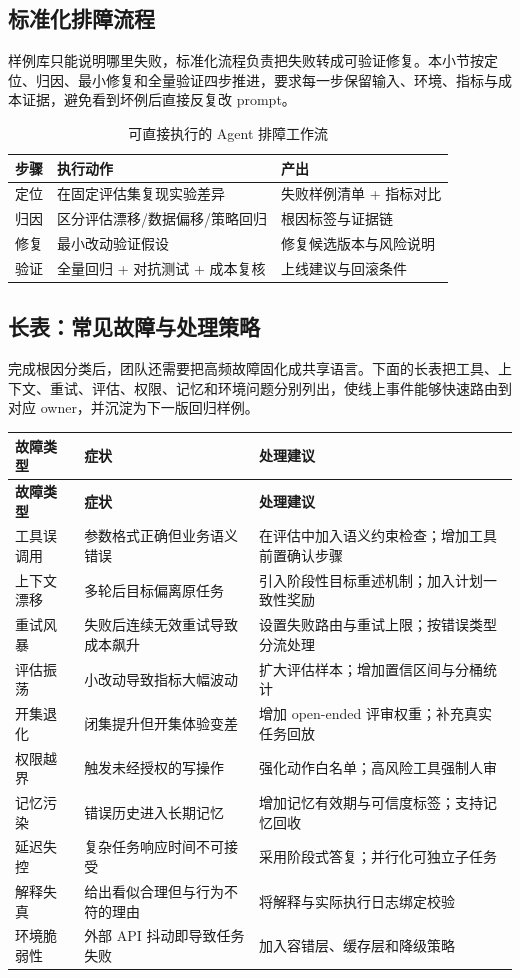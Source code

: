 \subsection{标准化排障流程}
样例库只能说明哪里失败，标准化流程负责把失败转成可验证修复。本小节按定位、归因、最小修复和全量验证四步推进，要求每一步保留输入、环境、指标与成本证据，避免看到坏例后直接反复改 prompt。
\begin{table}[H]
\centering
\begin{tabular}{p{2.5cm}p{4.2cm}p{4.9cm}}
\toprule
\textbf{步骤} & \textbf{执行动作} & \textbf{产出} \\
\midrule
定位 & 在固定评估集复现实验差异 & 失败样例清单 + 指标对比 \\
归因 & 区分评估漂移/数据偏移/策略回归 & 根因标签与证据链 \\
修复 & 最小改动验证假设 & 修复候选版本与风险说明 \\
验证 & 全量回归 + 对抗测试 + 成本复核 & 上线建议与回滚条件 \\
\bottomrule
\end{tabular}
\caption{可直接执行的 Agent 排障工作流}
\end{table}

\subsection{长表：常见故障与处理策略}
完成根因分类后，团队还需要把高频故障固化成共享语言。下面的长表把工具、上下文、重试、评估、权限、记忆和环境问题分别列出，使线上事件能够快速路由到对应 owner，并沉淀为下一版回归样例。
\begin{longtable}{p{2.7cm}p{4.0cm}p{4.9cm}}
\toprule
\textbf{故障类型} & \textbf{症状} & \textbf{处理建议} \\
\midrule
\endfirsthead
\toprule
\textbf{故障类型} & \textbf{症状} & \textbf{处理建议} \\
\midrule
\endhead
工具误调用 & 参数格式正确但业务语义错误 & 在评估中加入语义约束检查；增加工具前置确认步骤 \\
上下文漂移 & 多轮后目标偏离原任务 & 引入阶段性目标重述机制；加入计划一致性奖励 \\
重试风暴 & 失败后连续无效重试导致成本飙升 & 设置失败路由与重试上限；按错误类型分流处理 \\
评估振荡 & 小改动导致指标大幅波动 & 扩大评估样本；增加置信区间与分桶统计 \\
开集退化 & 闭集提升但开集体验变差 & 增加 open-ended 评审权重；补充真实任务回放 \\
权限越界 & 触发未经授权的写操作 & 强化动作白名单；高风险工具强制人审 \\
记忆污染 & 错误历史进入长期记忆 & 增加记忆有效期与可信度标签；支持记忆回收 \\
延迟失控 & 复杂任务响应时间不可接受 & 采用阶段式答复；并行化可独立子任务 \\
解释失真 & 给出看似合理但与行为不符的理由 & 将解释与实际执行日志绑定校验 \\
环境脆弱性 & 外部 API 抖动即导致任务失败 & 加入容错层、缓存层和降级策略 \\
\bottomrule
\end{longtable}

